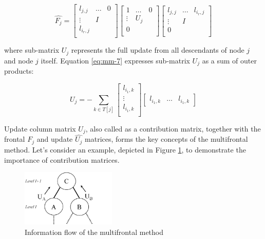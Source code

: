 \begin{equation} \label{eq:mm-6}
\hat{F_{j}} = \begin{bmatrix}
l_{j,j} & \dots & 0 \\
\vdots & I \\
l_{i_{r},j} \\
\end{bmatrix} 
\begin{bmatrix}
1 & \dots & 0 \\
\vdots & U_{j} \\
0 \\
\end{bmatrix} 
\begin{bmatrix}
l_{j,j} & \dots & l_{i_{r},j} \\
\vdots & I \\
0 \\
\end{bmatrix} 
\end{equation}

where sub-matrix $U_{j}$ represents the full update from all descendants of node $j$ and node $j$ itself. Equation \ref{eq:mm-7} expresses sub-matrix $U_{j}$ as a sum of outer products: 

\begin{equation} \label{eq:mm-7}
U_{j} = - \sum_{k \in T[j]}  \begin{bmatrix}
l_{i_1,k} \\
\vdots \\
l_{i_1,k} \\
\end{bmatrix} \begin{bmatrix}
l_{i_1,k} & \dots & l_{i_1,k}
\end{bmatrix}
\end{equation}


Update column matrix $U_{j}$, also called as a contribution matrix, together with the frontal $F_{j}$ and update $\hat{U_j}$ matrices, forms the key concepts of the multifrontal method. Let's consider an example, depicted in Figure \ref{fig:information-float}, to demonstrate the importance of contribution matrices.\\



\begin{figure}[!htpb]
  \centering
  \includegraphics[width=0.4\textwidth]{figures/chapter-2/information-flow.png}
\caption{Information flow of the multifrontal method}
\label{fig:information-float}
\end{figure}


